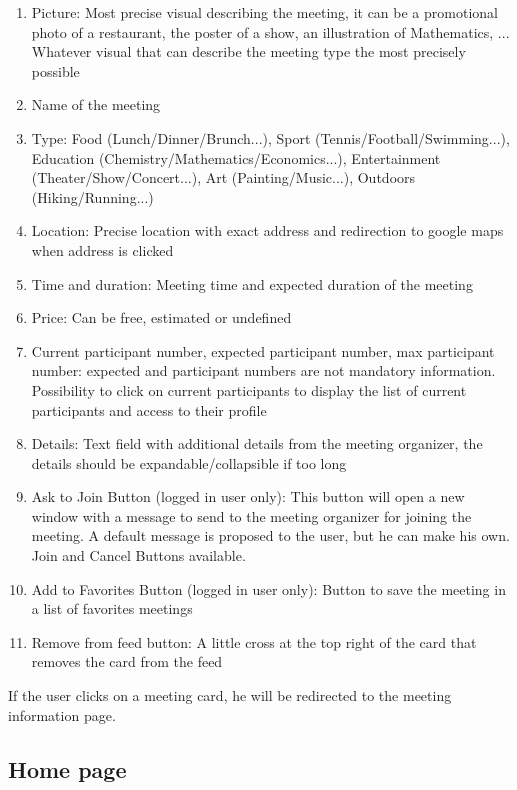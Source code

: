 \documentclass[conference]{IEEEtran}
\begin{document}
\begin{enumerate}
    \item Picture: Most precise visual describing the meeting, it can be a promotional photo of a restaurant, the poster of a show, an illustration of Mathematics, ... Whatever visual that can describe the meeting type the most precisely possible
    \item Name of the meeting
    \item Type: Food (Lunch/Dinner/Brunch...), Sport (Tennis/Football/Swimming...), Education (Chemistry/Mathematics/Economics...), Entertainment (Theater/Show/Concert...), Art (Painting/Music...), Outdoors (Hiking/Running...)
    \item Location: Precise location with exact address and redirection to google maps when address is clicked
    \item Time and duration: Meeting time and expected duration of the meeting
    \item Price: Can be free, estimated or undefined
    \item Current participant number, expected participant number, max participant number: expected and participant numbers are not mandatory information. Possibility to click on current participants to display the list of current participants and access to their profile
    \item Details: Text field with additional details from the meeting organizer, the details should be expandable/collapsible if too long
    \item Ask to Join Button (logged in user only): This button will open a new window with a message to send to the meeting organizer for joining the meeting. A default message is proposed to the user, but he can make his own. Join and Cancel Buttons available.
    \item Add to Favorites Button (logged in user only): Button to save the meeting in a list of favorites meetings
    \item Remove from feed button: A little cross at the top right of the card that removes the card from the feed
\end{enumerate}

If the user clicks on a meeting card, he will be redirected to the meeting information page.

\subsection{Home page}
\end{document}
